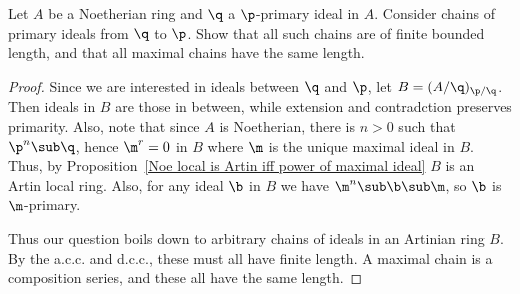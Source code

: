 \begin{exercise}
Let $A$ be a Noetherian ring and $\q$ a $\p$-primary ideal in $A$. Consider chains of primary ideals from $\q$ to $\p$. Show that all such chains are of finite bounded length, and that all maximal chains have the same length.
\end{exercise}
\begin{proof}
Since we are interested in ideals between $\q$ and $\p$, let $B=(A/\q)_{\p/\q}$. Then ideals in $B$ are those in between, while extension and contradction preserves primarity. Also, note that since $A$ is Noetherian, there is $n>0$ such that $\p^n\sub\q$, hence $\m^r=0$ in $B$ where $\m$ is the unique maximal ideal in $B$. Thus, by Proposition~\ref{Noe local is Artin iff power of maximal ideal} $B$ is an Artin local ring. Also, for any ideal $\b$ in $B$ we have $\m^n\sub \b\sub \m$, so $\b$ is $\m$-primary.\par
Thus our question boils down to arbitrary chains of ideals in an Artinian ring $B$. By the a.c.c. and d.c.c., these must all have finite length. A maximal chain is a composition series, and these all have the same length.
\end{proof}
